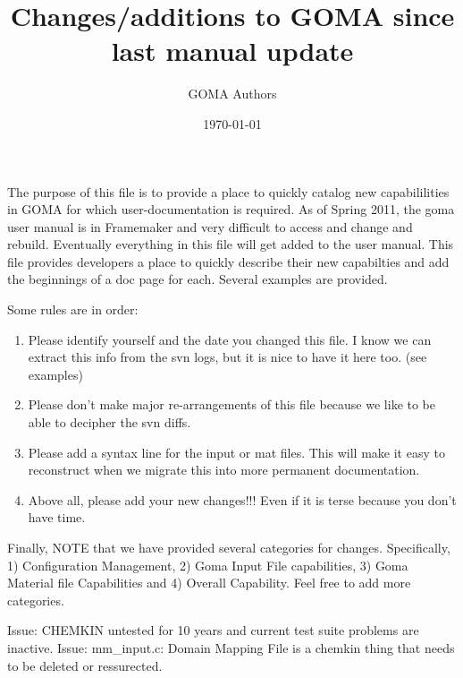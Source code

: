 \documentclass{article}
\title{Changes/additions to GOMA since last manual update}
\author{GOMA Authors}
\date{\today}
\begin{document}
\maketitle



The purpose of this file is to provide a place to quickly catalog new capabililities in GOMA for which user-documentation is required.  As of Spring 2011, the goma user manual is in Framemaker and very difficult to access and change and rebuild.    Eventually everything in this file will get added to the user manual.  This file provides developers a place to quickly describe their new capabilties and add the beginnings of a doc page for each.   Several examples are provided. 

Some rules are in order:
\begin{enumerate}
  \item Please identify yourself and the date you changed this file. I know we can extract this info from the svn logs, but it is nice to have it here too. (see examples)
  \item Please don't make major re-arrangements of this file because we like to be able to decipher the svn diffs. 
  \item Please add a syntax line for the input or mat files.   This will make it easy to reconstruct when we migrate this into more permanent documentation. 
  \item Above all, please add your new changes!!! Even if it is terse because you don't have time.   
\end{enumerate}

Finally, NOTE that we have provided several categories for changes.   Specifically, 1) Configuration Management, 2) Goma Input File capabilities, 3) Goma Material file Capabilities and 4) Overall Capability.    Feel free to add more categories.  


Issue:  CHEMKIN untested for 10 years and current test suite problems are inactive.   
Issue:  mm\_input.c: Domain Mapping File is a chemkin thing that needs to be deleted or ressurected.   
\end{document}
